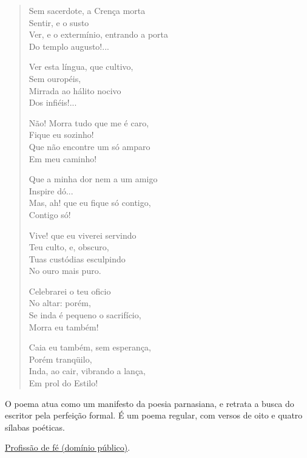 \begin{verse}
Sem sacerdote, a Crença morta \\
Sentir, e o susto \\
Ver, e o extermínio, entrando a porta \\
Do templo augusto!...

Ver esta língua, que cultivo, \\
Sem ouropéis, \\
Mirrada ao hálito nocivo \\
Dos infiéis!...

Não! Morra tudo que me é caro, \\
Fique eu sozinho! \\
Que não encontre um só amparo \\
Em meu caminho!

Que a minha dor nem a um amigo \\
Inspire dó... \\
Mas, ah! que eu fique só contigo, \\
Contigo só!

Vive! que eu viverei servindo \\
Teu culto, e, obscuro, \\
Tuas custódias esculpindo \\
No ouro mais puro.

Celebrarei o teu oficio \\
No altar: porém, \\
Se inda é pequeno o sacrifício, \\
Morra eu também!

Caia eu também, sem esperança, \\
Porém tranqüilo, \\
Inda, ao cair, vibrando a lança, \\
Em prol do Estilo!
\end{verse}

O poema atua como um manifesto da poesia parnasiana, e retrata a busca do escritor pela perfeição formal. É um poema regular, com versos de oito e quatro sílabas poéticas.

\href{http://www.dominiopublico.gov.br/download/texto/bi000179.pdf}{Profissão de fé (domínio público)}.

